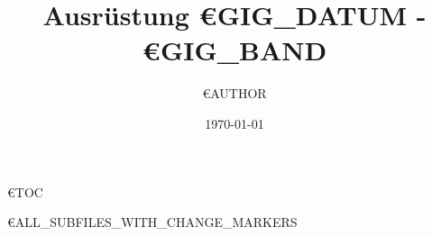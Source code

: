 \documentclass{article}
\title{Ausrüstung €{GIG_DATUM} - €{GIG_BAND}}
\author{€{AUTHOR}}
\date{\today}
\begin{document}
\maketitle

€{TOC}


€{ALL_SUBFILES_WITH_CHANGE_MARKERS}
\end{document}
